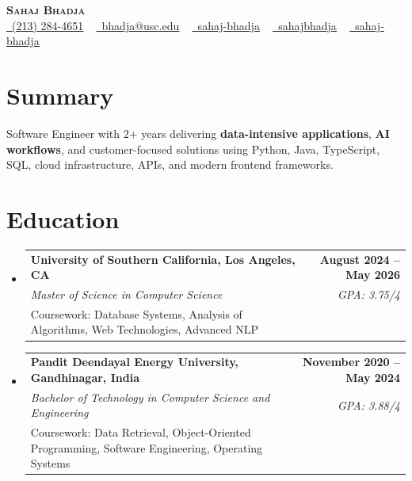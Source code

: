 \documentclass[letterpaper,10pt]{article}
\makeatletter
\newcommand{\sectionGap}{\vspace{-8pt}}
\newcommand{\resumeEduSubheading}[5]{\vspace{-1pt}\item\begin{tabular*}{1.0\textwidth}[t]{l@{\extracolsep{\fill}}r}\textbf{#1} & \textbf{\small #2} \\\textit{\small #3} & \textit{\small #4} \\\small #5 & \\\end{tabular*}\vspace{-4pt}}
\newcommand{\resumeSubHeadingListStart}{\begin{itemize}[leftmargin=0.0in, label={}]}
\newcommand{\resumeSubHeadingListEnd}{\end{itemize}}
\makeatother
\begin{document}
\begin{center}
{\Huge \scshape \textbf{Sahaj Bhadja}} \\ \vspace{1pt}
\small \href{tel:2132844651}{\faPhone\ \underline{(213) 284-4651}} ~ \href{mailto:bhadja@usc.edu}{\raisebox{-0.2\height}\faEnvelope\ \underline{bhadja@usc.edu}} ~
\href{https://www.linkedin.com/in/sahaj-bhadja/}{\raisebox{-0.2\height}\faLinkedin\ \underline{sahaj-bhadja}} ~ \href{https://github.com/SAHAJ-BHADJA}{\raisebox{-0.2\height}\faGithub\ \underline{sahajbhadja}} ~
\href{https://sahaj-bhadja.vercel.app/}{\raisebox{-0.2\height}\faGlobe\ \underline{sahaj-bhadja}}
\end{center}
\vspace{-16pt}
\section{Summary}
\begin{itemize}[leftmargin=0.15in, label={}]
\small{\item{Software Engineer with 2+ years delivering \textbf{data-intensive applications}, \textbf{AI workflows}, and customer-focused solutions using Python, Java, TypeScript, SQL, cloud infrastructure, APIs, and modern frontend frameworks.}}
\end{itemize}
\sectionGap
\section{Education}
\resumeSubHeadingListStart
\resumeEduSubheading{University of Southern California, Los Angeles, CA}{August 2024 -- May 2026}{Master of Science in Computer Science}{GPA: 3.75/4}{Coursework: Database Systems, Analysis of Algorithms, Web Technologies, Advanced NLP}
\resumeEduSubheading{Pandit Deendayal Energy University, Gandhinagar, India}{November 2020 -- May 2024}{Bachelor of Technology in Computer Science and Engineering}{GPA: 3.88/4}{Coursework: Data Retrieval, Object-Oriented Programming, Software Engineering, Operating Systems}
\resumeSubHeadingListEnd
\sectionGap
\end{document}
